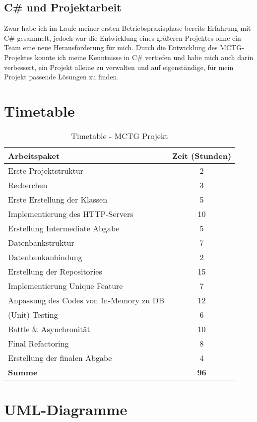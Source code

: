 \documentclass[a4paper, 12pt]{article}
\begin{document}
\subsection{C\# und Projektarbeit}
Zwar habe ich im Laufe meiner ersten Betriebspraxisphase bereits Erfahrung mit C\# gesammelt, jedoch war die Entwicklung eines größeren Projektes ohne ein Team eine neue Herausforderung für mich.
Durch die Entwicklung des MCTG-Projektes konnte ich meine Kenntnisse in C\# vertiefen und habe mich auch darin verbessert, ein Projekt alleine zu verwalten und auf eigenständige, für mein Projekt passende Lösungen zu finden.
\pagebreak

\section{Timetable}
\begin{table}[h!]
\centering
\begin{tabular}{|l|c|}
\hline
\textbf{Arbeitspaket} & \textbf{Zeit (Stunden)} \\ \hline
Erste Projektstruktur & 2 \\ \hline
Recherchen & 3 \\ \hline
Erste Erstellung der Klassen & 5 \\ \hline
Implementierung des HTTP-Servers & 10 \\ \hline
Erstellung Intermediate Abgabe & 5 \\ \hline
Datenbankstruktur & 7 \\ \hline
Datenbankanbindung & 2 \\ \hline
Erstellung der Repositories & 15 \\ \hline
Implementierung Unique Feature & 7 \\ \hline
Anpassung des Codes von In-Memory zu DB & 12 \\ \hline
(Unit) Testing & 6 \\ \hline
Battle \& Asynchronität & 10 \\ \hline
Final Refactoring & 8 \\ \hline
Erstellung der finalen Abgabe & 4 \\ \hline
\textbf{Summe} & \textbf{96} \\ \hline
\end{tabular}
\caption{Timetable - MCTG Projekt}
\label{tab:timetable}
\end{table}

\section{UML-Diagramme}
\end{document}
